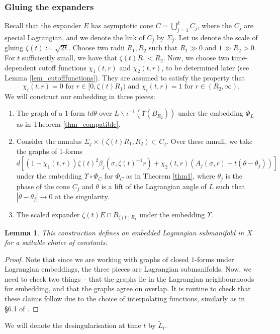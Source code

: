 \documentclass[10pt, a4paper]{article}
\theoremstyle{plain}%
\newtheorem{lem}[theorem]{Lemma}
\theoremstyle{definition}
\numberwithin{figure}{section}
\numberwithin{equation}{section}
\newcommand{\rt}{\rightarrow}
\newcommand{\tL}{\widetilde{L}}
\begin{document}
 \subsubsection{Gluing the expanders}
 Recall that the expander $E$ has asymptotic cone $C=\bigcup_{j=1}^k C_j$, where the $C_j$ are special Lagrangian, and we denote the link of $C_j$ by $\Sigma_j$. 
 Let us denote the scale of gluing $\zeta(t):=\sqrt{2t}$. Choose two radii $R_1,R_2$ such that $R_1\gg0$ and $1\gg R_2>0$. For $t$ sufficiently small, we have that ${\zeta(t)}R_1<R_2$. Now, we choose two time-dependent cutoff functions $\chi_1(t,r)$ and $\chi_2(t,r)$, to be determined later (see Lemma \ref{lem_cutofffunctions}). They are assumed to satisfy the property that \begin{equation}\label{eq_cutoff}
 \chi_i(t,r) = 0 \textrm{ for } r\in[0,\zeta(t)R_1) \textrm{ and } \chi_i(t,r)=1 \textrm{ for }r\in (R_2,\infty). 
 \end{equation}
  We will construct our embedding in three pieces:
 \begin{enumerate}
 	\item The graph of a $1$-form $td\theta$ over $L\backslash \iota^{-1}(\Upsilon(B_{R_2}))$ under the embedding $\Phi_L$ as in Theorem \ref{thm_compatible}.
 	\item Consider the annulus $\Sigma_j \times ({\zeta(t)}R_1,R_2)\subset C_j$. Over these annuli, we take the graphs of 1-forms \[
 	d[ (1-\chi_1(t,r)){\zeta(t)}^2\beta_j(\sigma,{\zeta(t)}^{-1}r)+\chi_2(t,r)(A_j(\sigma,r)+t(\theta-\theta_j))]
 	\] under the embedding $\Upsilon\circ \Phi_C$ for $\Phi_C$ as in Theorem \ref{thm1}, where $\theta_j$ is the phase of the cone $C_j$ and $\theta$ is a lift of the Lagrangian angle of $L$ such that $|\theta-\theta_j|\rt 0$ at the singularity. 
 	
 	\item The scaled expander ${\zeta(t)}E \cap B_{\zeta(t)R_1}$ under the embedding $\Upsilon$.
 	
 	
 	
 \end{enumerate}
 
 \begin{lem}
 	This construction defines an embedded Lagrangian submanifold in $X$ for a suitable choice of constants.
 \end{lem}
 \begin{proof}
 	Note that since we are working with graphs of closed $1$-forms under Lagrangian embeddings, the three pieces are Lagrangian submanifolds. Now, we need to check two things -- that the graphs lie in the Lagrangian neighbourhoods for embedding, and that the graphs agree on overlap. It is routine to check that these claims follow due to the choice of interpolating functions, similarly as in \S 6.1 of \cite{Joy04}. 
 \end{proof}
 We will denote the desingularisation at time $t$ by $\tL_t$.
 
\end{document}
